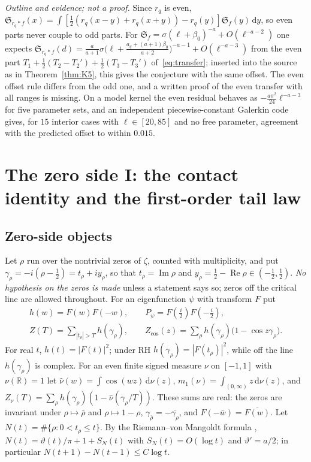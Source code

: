 \documentclass[11pt]{amsart}
\newcommand{\R}{\mathbb{R}}
\newcommand{\Sj}{\mathfrak{S}}
\newcommand{\dd}{\,\mathrm{d}}
\DeclareMathOperator{\re}{Re}
\DeclareMathOperator{\im}{Im}
\theoremstyle{definition}
\theoremstyle{remark}
\numberwithin{equation}{section}
\begin{document}
\emph{Outline and evidence; not a proof.} Since $r_q$ is even, $\Sj_{r_q*f}(x)=\int[\frac12(r_q(x-y)+r_q(x+y))-r_q(y)]\Sj_f(y)\dd y$, so even parts never couple to odd parts. For $\Sj_f=\sigma(\ell+\beta_0)^{-a}+O(\ell^{-a-2})$ one expects $\Sj_{r_q*f}(d)=\frac a{a+1}\sigma\bigl(\ell+\frac{a_q+(a+1)\beta_0}{a+2}\bigr)^{-a-1}+O(\ell^{-a-3})$ from the even part $T_1+\frac12(T_2-T_2')+\frac12(T_3-T_3')$ of~\eqref{eq:transfer}; inserted into the source as in Theorem~\ref{thm:K5}, this gives the conjecture with the same offset. The even offset rule differs from the odd one, and a written proof of the even transfer with all ranges is missing. On a model kernel the even residual behaves as $-\frac{a\pi^2}{24}\ell^{-a-3}$ for five parameter sets, and an independent piecewise-constant Galerkin code gives, for $15$ interior cases with $\ell\in[20,85]$ and no free parameter, agreement with the predicted offset to within $0.015$.


\section{The zero side I: the contact identity and the first-order tail law}\label{sec:zero1}

\subsection{Zero-side objects}\label{sec:zeroobj}
Let $\rho$ run over the nontrivial zeros of $\zeta$, counted with multiplicity, and put $\gamma_\rho=-i(\rho-\frac12)=t_\rho+iy_\rho$, so that $t_\rho=\im\rho$ and $y_\rho=\frac12-\re\rho\in(-\frac12,\frac12)$. \emph{No hypothesis on the zeros is made} unless a statement says so; zeros off the critical line are allowed throughout. For an eigenfunction $\psi$ with transform $F$ put
\begin{gather*}
h(w)=F(w)F(-w),\qquad P_\psi=F(\tfrac i2)F(-\tfrac i2),\\
Z(T)=\sum_{|t_\rho|>T}h(\gamma_\rho),\qquad Z_{\cos}(z)=\sum_\rho h(\gamma_\rho)\bigl(1-\cos z\gamma_\rho\bigr).
\end{gather*}
For real $t$, $h(t)=|F(t)|^2$; under RH $h(\gamma_\rho)=|F(t_\rho)|^2$, while off the line $h(\gamma_\rho)$ is complex. For an even finite signed measure $\nu$ on $[-1,1]$ with $\nu(\R)=1$ let $\hat\nu(w)=\int\cos(wz)\dd\nu(z)$, $m_1(\nu)=\int_{(0,\infty)}z\dd\nu(z)$, and $Z_\nu(T)=\sum_\rho h(\gamma_\rho)(1-\hat\nu(\gamma_\rho/T))$. These sums are real: the zeros are invariant under $\rho\mapsto\bar\rho$ and $\rho\mapsto1-\rho$, $\gamma_{\bar\rho}=-\overline{\gamma_\rho}$, and $F(-\bar w)=\overline{F(w)}$. Let $N(t)=\#\{\rho:0<t_\rho\le t\}$. By the Riemann--von Mangoldt formula \cite[Ch.~IX]{Tit86}, $N(t)=\vartheta(t)/\pi+1+S_N(t)$ with $S_N(t)=O(\log t)$ and $\vartheta'=a/2$; in particular $N(t+1)-N(t-1)\le C\log t$.
\end{document}

